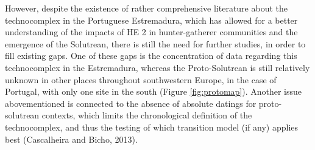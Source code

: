 \documentclass[12pt,twoside]{reedthesis}
\begin{document}
However, despite the existence of rather comprehensive literature about the technocomplex in the Portuguese Estremadura, which has allowed for a better understanding of the impacts of HE 2 in hunter-gatherer communities and the emergence of the Solutrean, there is still the need for further studies, in order to fill existing gaps. One of these gaps is the concentration of data regarding this technocomplex in the Estremadura, whereas the Proto-Solutrean is still relatively unknown in other places throughout southwestern Europe, in the case of Portugal, with only one site in the south (Figure \ref{fig:protomap}). Another issue abovementioned is connected to the absence of absolute datings for proto-solutrean contexts, which limits the chronological definition of the technocomplex, and thus the testing of which transition model (if any) applies best (Cascalheira and Bicho, 2013).
\end{document}
